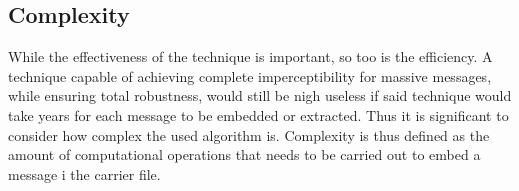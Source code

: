 \subsection{Complexity}
While the effectiveness of the technique is important, so too is the efficiency. A technique capable of achieving complete imperceptibility for massive messages, while ensuring total robustness, would still be nigh useless if said technique would take years for each message to be embedded or extracted. Thus it is significant to consider how complex the used algorithm is. Complexity is thus defined as the amount of computational operations that needs to be carried out to embed a message i the carrier file.

